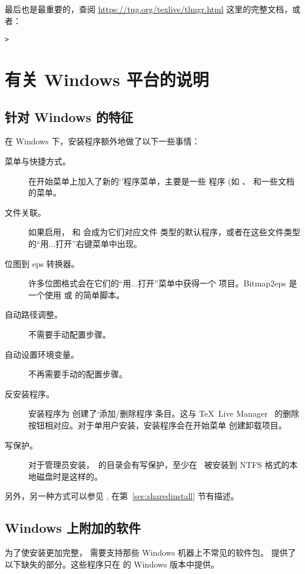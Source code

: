 \documentclass{article}
\begin{document}
最后也是最重要的，查阅 \url{https://tug.org/texlive/tlmgr.html}
这里的完整文档，或者：
\begin{alltt}
  > 
\end{alltt}

\section{有关 Windows 平台的说明}
\label{sec:windows}

\subsection{针对 Windows 的特征}
\label{sec:winfeatures}

在 Windows 下，安装程序额外地做了以下一些事情：
\begin{description}
  \item[菜单与快捷方式。] 在开始菜单上加入了新的`\TL{}'程序菜单，主要是一些
    \GUI{} 程序 (如 、 和一些文档的菜单。
  \item[文件关联。] 如果启用， 和  会成为它们对应文件
    类型的默认程序，或者在这些文件类型的“用...打开”右键菜单中出现。
  \item[位图到 eps 转换器。] 许多位图格式会在它们的“用...打开”菜单中获得一个
     项目。Bitmap2eps 是一个使用  或
     的简单脚本。
  \item[自动路径调整。] 不需要手动配置步骤。
  \item[自动设置环境变量。] 不再需要手动的配置步骤。
  \item[反安装程序。] 安装程序为 \TL{} 创建了`添加/删除程序'条目。这与
    \TeX\ Live Manager \GUI\ 的删除按钮相对应。对于单用户安装，安装程序会在开始菜单
    创建卸载项目。
  \item[写保护。] 对于管理员安装，\TL\ 的目录会有写保护，至少在 \TL\ 被安装到 NTFS
    格式的本地磁盘时是这样的。
\end{description}

另外，另一种方式可以参见 , 在第~\ref{sec:sharedinstall} 节有描述。

\subsection{Windows 上附加的软件}

为了使安装更加完整，\TL{} 需要支持那些 Windows 机器上不常见的软件包。
\TL{} 提供了以下缺失的部分。这些程序只在 \TL{} 的 Windows 版本中提供。
\end{document}
